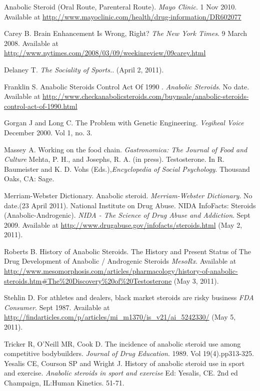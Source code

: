  

\begin{thebibliography}{99}


 Anabolic Steroid (Oral Route, Parenteral Route). {\it Mayo Clinic}. 1 Nov 2010. Available at \url{http://www.mayoclinic.com/health/drug-information/DR602077}

 Carey B.  Brain Enhancement Is Wrong, Right? {\it The New York Times}. 9 March 2008. Available at \url{http://www.nytimes.com/2008/03/09/weekinreview/09carey.html}

 Delaney T. {\it The Sociality of Sports.}. (April 2, 2011).

 Franklin S. Anabolic Steroids Control Act Of 1990 . {\it Anabolic Steroids}. No date. Available at \url{http://www.checkanabolicsteroids.com/buynsale/anabolic-steroids-control-act-of-1990.html}

 Gorgan J and Long C.  The Problem with Genetic Engineering. {\it Vegiheal Voice} December 2000. Vol 1, no. 3.

 Massey A. Working on the food chain. {\it Gastronomica: The Journal of Food and Culture} 
 Mehta, P. H., and Josephs, R. A. (in press). Testosterone. In R. Baumeister and K. D. Vohs (Eds.),{\it Encyclopedia of Social Psychology}. Thousand Oaks, CA: Sage.

 Merriam-Webster Dictionary. Anabolic steroid. {\it Merriam-Webster Dictionary}. No date.(23 April 2011).
 National Institute on Drug Abuse. NIDA InfoFacts: Steroids (Anabolic-Androgenic). {\it NIDA - The Science of Drug Abuse and Addiction}. Sept 2009. Available at \url{http://www.drugabuse.gov/infofacts/steroids.html} (May 2, 2011).

 Roberts B. History of Anabolic Steroids. The History and Present Status of The Drug Development of Anabolic / Androgenic Steroids {\it MesoRx}. Available at \url{http://www.mesomorphosis.com/articles/pharmacology/history-of-anabolic-steroids.htm#The\%20Discovery\%20of\%20Testosterone} (May 3, 2011).

 Stehlin D. For athletes and dealers, black market steroids are risky business {\it FDA Consumer}. Sept 1987. Available at \url{http://findarticles.com/p/articles/mi_m1370/is_v21/ai_5242330/} (May 5, 2011).

 Tricker R, O'Neill MR, Cook D. The incidence of anabolic steroid use among competitive bodybuilders. {\it Journal of Drug Education}. 1989. Vol 19(4).pp313-325.
 Yesalis CE, Courson SP and Wright J.  History of anabolic steroid use in sport and exercise.  {\it Anabolic steroids in sport and exercise} Ed: Yesalis, CE. 2nd ed Champaign, IL:Human Kinetics. 51-71.
\end{thebibliography}
